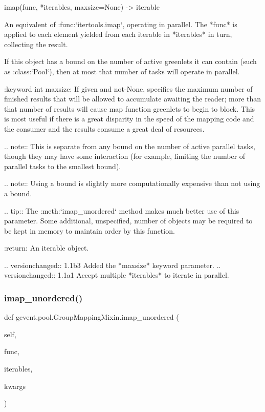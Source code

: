 \begin{DoxyVerb}imap(func, *iterables, maxsize=None) -> iterable

An equivalent of :func:`itertools.imap`, operating in parallel.
The *func* is applied to each element yielded from each
iterable in *iterables* in turn, collecting the result.

If this object has a bound on the number of active greenlets it can
contain (such as :class:`Pool`), then at most that number of tasks will operate
in parallel.

:keyword int maxsize: If given and not-None, specifies the maximum number of
    finished results that will be allowed to accumulate awaiting the reader;
    more than that number of results will cause map function greenlets to begin
    to block. This is most useful if there is a great disparity in the speed of
    the mapping code and the consumer and the results consume a great deal of resources.

    .. note:: This is separate from any bound on the number of active parallel
       tasks, though they may have some interaction (for example, limiting the
       number of parallel tasks to the smallest bound).

    .. note:: Using a bound is slightly more computationally expensive than not using a bound.

    .. tip:: The :meth:`imap_unordered` method makes much better
use of this parameter. Some additional, unspecified,
number of objects may be required to be kept in memory
to maintain order by this function.

:return: An iterable object.

.. versionchanged:: 1.1b3
    Added the *maxsize* keyword parameter.
.. versionchanged:: 1.1a1
    Accept multiple *iterables* to iterate in parallel.
\end{DoxyVerb}
 \mbox{\label{classgevent_1_1pool_1_1_group_mapping_mixin_a2631d27e737e675bea211e4b5576325f}} 
\subsubsection{\texorpdfstring{imap\+\_\+unordered()}{imap\_unordered()}}
{\footnotesize\ttfamily def gevent.\+pool.\+Group\+Mapping\+Mixin.\+imap\+\_\+unordered (\begin{DoxyParamCaption}\item[{}]{self,  }\item[{}]{func,  }\item[{}]{iterables,  }\item[{}]{kwargs }\end{DoxyParamCaption})}

